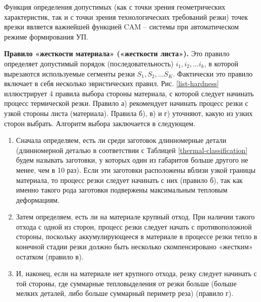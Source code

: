 \documentclass[12pt,twoside]{report}
\begin{document}
Функция определения допустимых
(как с точки зрения геометрических характеристик,
так и с точки зрения технологических требований резки)
точек врезки является важнейшей функцией CAM – системы
при автоматическом режиме формирования УП.

{\bf Правило «жесткости материала» («жесткости листа»).}
Это правило определяет допустимый порядок
(последовательность)
$i_1, i_2, \dots i_k$,
в которой вырезаются используемые сегменты резки
$S_1, S_2, \dots S_K$.
Фактически это правило включает в себя несколько эвристических правил.
Рис. \ref{list-hardness}
иллюстрирует 4 правила выбора стороны материала,
с которой следует начинать процесс термической резки.
Правило а) рекомендует начинать процесс резки с узкой стороны листа (материала).
Правила б), в) и г) уточняют,
какую из узких сторон выбрать.
Алгоритм выбора заключается в следующем.

\begin{enumerate}
  \item
  Сначала определяем,
  есть ли среди заготовок длинномерные детали
  (длинномерной деталью в соответствии с Таблицей \ref{thermal-classification}
  будем называть заготовки, у которых один из габаритов больше другого не менее,
  чем в 10 раз).
  Если эти заготовки расположены вблизи
  узкой границы материала,
  то процесс резки следует начинать с них
  (правило б),
  так как именно такого рода заготовки
  подвержены максимальным тепловым деформациям.
  \item
  Затем определяем,
  есть ли на материале крупный отход.
  При наличии такого отхода с одной из сторон,
  процесс резки следует начать с противоположной стороны,
  поскольку аккумулирующееся в материале в процессе резки
  тепло в конечной стадии резки должно быть
  несколько скомпенсировано «жестким» остатком
  (правило в).
  \item
  И, наконец,
  если на материале нет крупного отхода,
  резку следует начинать с той стороны,
  где суммарные тепловыделения от резки больше
  (больше мелких деталей, либо больше суммарный периметр реза)
  (правило г).
\end{enumerate}
\end{document}
